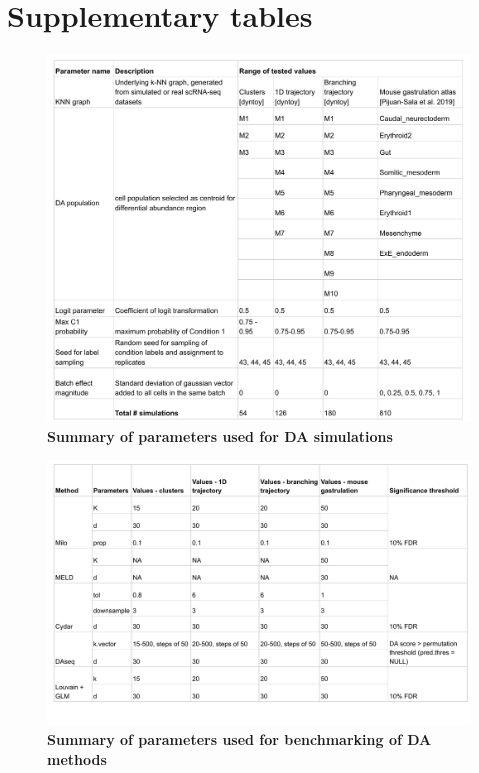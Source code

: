 \documentclass[
]{article}
\begin{document}
\hypertarget{supplementary-tables}{%
\section*{Supplementary tables}\label{supplementary-tables}}

\renewcommand{\figurename}{Supplementary Table}
\setcounter{figure}{0}

\begin{figure}
\centering
\includegraphics{suppl_tables/table_simulation_params.pdf}
\caption{\label{fig:sup-tab-2}\textbf{Summary of parameters used for DA simulations}}
\end{figure}



\begin{figure}
\centering
\includegraphics{suppl_tables/table_methods_params.pdf}
\caption{\label{fig:sup-tab-3}\textbf{Summary of parameters used for benchmarking of DA methods}}
\end{figure}
\end{document}
